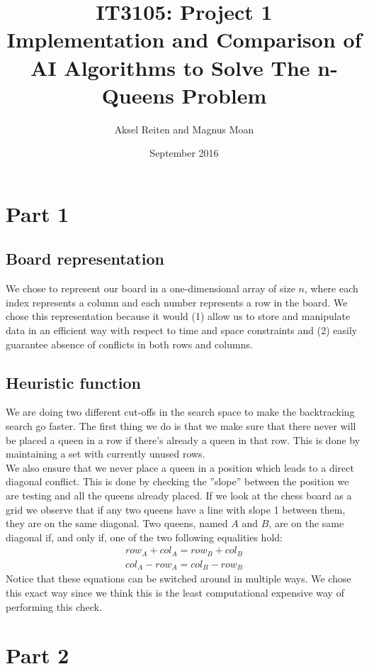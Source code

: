 \documentclass{article}
\title{IT3105: Project 1 \\ Implementation and Comparison of AI Algorithms to Solve The n-Queens Problem}
\author{Aksel Reiten and Magnus Moan}
\date{September 2016}
\begin{document}
\maketitle
\tableofcontents

\section{Part 1}
\subsection{Board representation}
We chose to represent our board in a one-dimensional array of size $n$, where each index represents a column and each number represents a row in the board. We chose this representation because it would (1) allow us to store and manipulate data in an efficient way with respect to time and space constraints and (2) easily guarantee absence of conflicts in both rows and columns.

\subsection{Heuristic function}
We are doing two different cut-offs in the search space to make the backtracking search go faster. The first thing we do is that
we make sure that there never will be placed a queen in a row if there's already a queen in that row. This is done by maintaining
a set with currently unused rows. \\
We also ensure that we never place a queen in a position which leads to a direct diagonal conflict. This is done by checking the
''slope'' between the position we are testing and all the queens already placed. If we look at the chess board as a grid we observe
that if any two queens have a line with slope 1 between them, they are on the same diagonal.
Two queens, named $A$ and $B$, are on the same diagonal if, and only if, one of the two following equalities hold:
\begin{align}
  row_A + col_A = row_B + col_B \\[1.3ex]
  col_A - row_A = col_B - row_B
\end{align}
Notice that these equations can be switched around in multiple ways. We chose this exact way since we think this is the least
computational expensive way of performing this check.

\section{Part 2}
\end{document}

